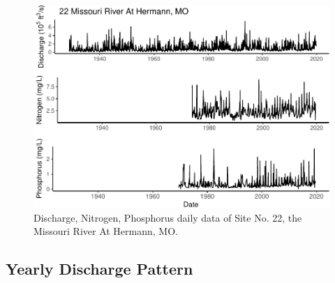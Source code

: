 \documentclass[12pt,]{article}
\makeatletter
\def\maxwidth{\ifdim\Gin@nat@width>\linewidth\linewidth\else\Gin@nat@width\fi}
\makeatother
\begin{document}
\begin{figure}[H]
\includegraphics[width=\maxwidth]{Missouri-Reasearch-Project---FINAL_files/figure-latex/dataexample-1} \caption{\label{fig:dataexample} Discharge, Nitrogen, Phosphorus daily data of Site No. 22, the  Missouri River At Hermann, MO.}\label{fig:dataexample}
\end{figure}

\hypertarget{yearly-discharge-pattern}{%
\subsection{Yearly Discharge Pattern}\label{yearly-discharge-pattern}}
\end{document}
